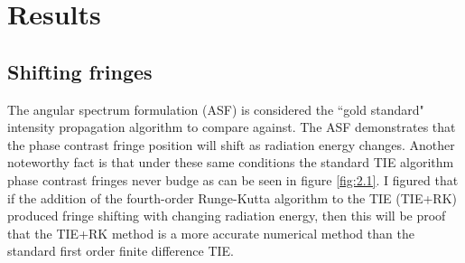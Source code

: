 \documentclass[10pt, a4paper, singlespacing]{report}
\begin{document}

\section{Results}\label{Results}

\subsection{Shifting fringes}\label{betterthan}

The angular spectrum formulation (ASF) is considered the ``gold standard" intensity propagation algorithm to compare against. The ASF demonstrates that the phase contrast fringe position will shift as radiation energy changes. Another noteworthy fact is that under these same conditions the standard TIE algorithm phase contrast fringes never budge as can be seen in figure \ref{fig:2.1}. I figured that if the addition of the fourth-order Runge-Kutta algorithm to the TIE (TIE+RK) produced fringe shifting with changing radiation energy, then this will be proof that the TIE+RK method is a more accurate numerical method than the standard first order finite difference TIE.
\end{document}
